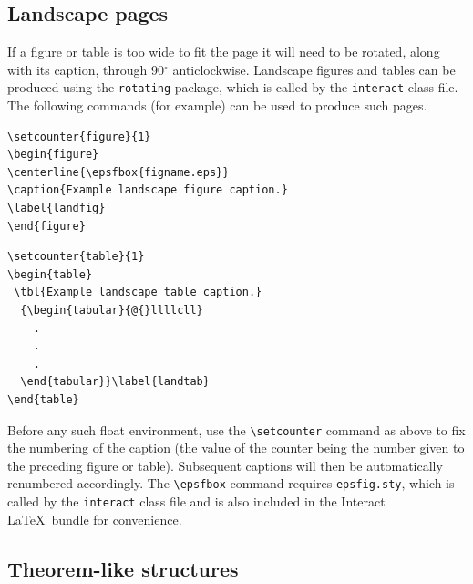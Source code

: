 \documentclass[]{interact}
\theoremstyle{plain}%
\theoremstyle{definition}
\theoremstyle{remark}
\begin{document}
\subsection{Landscape pages}

If a figure or table is too wide to fit the page it will need to be rotated, along with its caption, through 90$^{\circ}$ anticlockwise. Landscape figures and tables can be produced using the \verb"rotating" package, which is called by the \texttt{interact} class file. The following commands (for example) can be used to produce such pages.
\begin{verbatim}
\setcounter{figure}{1}
\begin{figure}
\centerline{\epsfbox{figname.eps}}
\caption{Example landscape figure caption.}
\label{landfig}
\end{figure}
\end{verbatim}
\begin{verbatim}
\setcounter{table}{1}
\begin{table}
 \tbl{Example landscape table caption.}
  {\begin{tabular}{@{}llllcll}
    .
    .
    .
  \end{tabular}}\label{landtab}
\end{table}
\end{verbatim}
Before any such float environment, use the \verb"\setcounter" command as above to fix the numbering of the caption (the value of the counter being the number given to the preceding figure or table). Subsequent captions will then be automatically renumbered accordingly. The \verb"\epsfbox" command requires \verb"epsfig.sty", which is called by the \texttt{interact} class file and is also included in the \textsf{Interact} \LaTeX\ bundle for convenience.



\subsection{Theorem-like structures}
\end{document}
